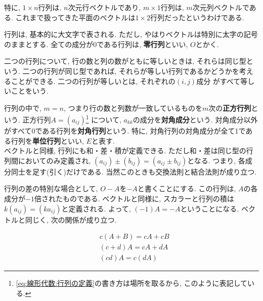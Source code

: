         特に, $1\times n$行列は, $n$次元行ベクトルであり, $m\times 1$行列は, $m$次元列ベクトルである. これまで扱ってきた平面のベクトルは$1\times 2$行列だったというわけである.

        行列は, 基本的に大文字で表される. ただし, やはりベクトルは特別に太字の記号のままとする. 全ての成分が0である行列は, \textbf{零行列}といい, $O$とかく.

        二つの行列について, 行の数と列の数がともに等しいときは, それらは同じ型という. 二つの行列が同じ型であれば, それらが等しい行列であるかどうかを考えることができる. 二つの行列が等しいとは, それぞれの$(i,j)$成分
        がすべて等しいことをいう.

        行列の中で, $m=n$, つまり行の数と列数が一致しているものを$m$次の\textbf{正方行列}という. 正方行列$A=(a_{ij})$\footnote{\eqref{eq:線形代数:行列の定義}の書き方は場所を取るから, このように表記している.}
        について, $a_{kk}$の成分を\textbf{対角成分}という. 対角成分以外がすべて0である行列を\textbf{対角行列}という.
        特に, 対角行列の対角成分が全て1である行列を\textbf{単位行列}といい, $E$と表す.\\

        ベクトルと同様, 行列にも和・差・積が定義できる. ただし和・差は同じ型の行列間においてのみ定義され, $(a_{ij})\pm(b_{ij})=(a_{ij}\pm b_{ij})$となる.
        つまり, 各成分同士を足す(引く)だけである. 当然このときも交換法則と結合法則が成り立つ.

        行列の差の特別な場合として, $O-A$を$-A$と書くことにする. この行列は, $A$の各成分が$-1$倍されたものである. ベクトルと同様に, スカラーと行列の積は$k(a_{ij})=(ka_{ij})$と定義される. 
        よって, $(-1)A=-A$ということになる. ベクトルと同じく, 次の関係が成り立つ.

        \begin{align}
            &c(A + B)=cA + cB\\
            &(c+d)A=cA + dA\\
            &(cd)A=c(dA) 
        \end{align}

